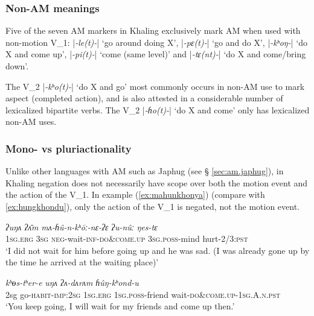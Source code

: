 \documentclass[oneside,a4paper,11pt]{article}
\newcommand{\ipa}[1]{{\phon\textit{#1}}}
\newcommand{\dhatu}[2]{|\ipa{#1}| `#2'}
\begin{document}
 \subsubsection{Non-AM meanings} \label{sec:khaling.non.am}
Five of the seven AM markers in Khaling exclusively mark AM when used with non-motion V_1: \dhatu{-le(t)-}{go around doing X}, \dhatu{-pɛ(t)-}{go and do X},  \dhatu{-kʰoŋ-}{do X and come up}, \dhatu{-pi(t)-}{come (same level)} and \dhatu{-tɛ(nt)-}{do X and come/bring down}.

 The V_2   \dhatu{-kʰo(t)-}{do X and go} most commonly occurs in non-AM use to mark aspect (completed action), and is also attested in a considerable number of lexicalized bipartite verbs. The V_2  \dhatu{-ɦo(t)-}{do X and come} only has lexicalized non-AM uses. 
  
\subsubsection{Mono- vs pluriactionality} \label{sec:khaling.pluriactionality}

Unlike other languages with AM such as Japhug (see § \ref{sec:am.japhug}), in Khaling negation does not necessarily have scope over both the motion event and the action of the V_1. In example (\ref{ex:mahunkhonya}) (compare with \ref{ex:hungkhondu}), only the action of the V_1 is negated, not the motion event.  

\begin{exe}
\ex \label{ex:mahunkhonya}
 \gll
\ipa{ʔuŋʌ} \ipa{ʔʌ̄m} \ipa{mʌ-ɦû-n-kʰōː-nɛ-ʔɛ} \ipa{ʔu-nûː} \ipa{ŋes-tɛ} \\
\textsc{1sg}.\textsc{erg} \textsc{3sg} \textsc{neg}-wait-\textsc{inf}-\textsc{do\&come.up} \textsc{3sg}.\textsc{poss}-mind hurt-2/3:\textsc{pst} \\
\glt `I did not wait for him before going up and he was sad. (I was already gone up by the time he arrived at the waiting place)'
\end{exe}

\begin{exe}  
\ex \label{ex:hungkhondu}
 \gll  \ipa{ʔīn} \ipa{kʰɵs-tʰer-e} \ipa{uŋʌ} \ipa{ʔʌ-dʌrʌm} \ipa{ɦûŋ-kʰond-u} \\
 2sg go-\textsc{habit}-\textsc{imp}:\textsc{2sg} \textsc{1sg}.\textsc{erg} \textsc{1sg}.\textsc{poss}-friend wait-\textsc{do\&come.up}-\textsc{1sg.A.n.pst} \\
\glt `You keep going, I will wait for my friends and come up then.'
\end{exe}
\end{document}
